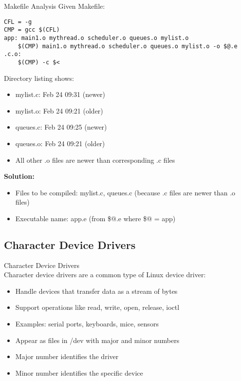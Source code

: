 \begin{example2}{Makefile Analysis}
    Given Makefile:
    
\begin{lstlisting}[style=basesmol]
CFL = -g
CMP = gcc $(CFL)
app: main1.o mythread.o scheduler.o queues.o mylist.o
	$(CMP) main1.o mythread.o scheduler.o queues.o mylist.o -o $@.e
.c.o:
	$(CMP) -c $<
\end{lstlisting}

    Directory listing shows:
    \begin{itemize}
        \item mylist.c: Feb 24 09:31 (newer)
        \item mylist.o: Feb 24 09:21 (older)  
        \item queues.c: Feb 24 09:25 (newer)
        \item queues.o: Feb 24 09:21 (older)
        \item All other .o files are newer than corresponding .c files
    \end{itemize}
    
    \tcblower
    
    \textbf{Solution:}
    \begin{itemize}
        \item Files to be compiled: mylist.c, queues.c (because .c files are newer than .o files)
        \item Executable name: app.e (from \$@.e where \$@ = app)
    \end{itemize}
\end{example2}



\raggedcolumns
\columnbreak

\subsection{Character Device Drivers}

\begin{definition}{Character Device Drivers}\\
    Character device drivers are a common type of Linux device driver:
    \begin{itemize}
        \item Handle devices that transfer data as a stream of bytes
        \item Support operations like read, write, open, release, ioctl
        \item Examples: serial ports, keyboards, mice, sensors
        \item Appear as files in /dev with major and minor numbers
        \item Major number identifies the driver
        \item Minor number identifies the specific device
    \end{itemize}
\end{definition}



